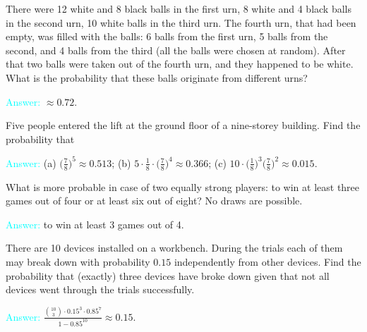 \documentclass[14pt]{exam}
\begin{document}
\begin{questions}
		
		\question
		There were 12 white and 8 black balls in the first urn, 8 white and 4 black balls in the second urn, 10 white balls in the third urn. The fourth urn, that had been empty, was filled with the balls: 6 balls from the first urn, 5 balls from the second, and 4 balls from the third (all the balls were chosen at random). After that two balls were taken out of the fourth urn, and they happened to be white. What is the probability that these balls originate from different urns?
		
		\textcolor{cyan}{Answer:} $\approx0.72$.
		
		\question
		Five people entered the lift at the ground floor of a nine-storey building. Find the probability that
		
		
		\textcolor{cyan}{Answer:} (a) $ \bigr(\frac{7}{8}\bigr)^5 \approx 0.513$; (b) $5 \cdot \frac{1}{8}\cdot \bigr(\frac{7}{8}\bigr)^4\approx 0.366$; (c) $10 \cdot \bigr(\frac{1}{8}\bigr)^3 \bigr(\frac{7}{8}\bigr)^2\approx 0.015$.
		
		\question
		What is more probable in case of two equally strong players: to win at least three games out of four or at least six out of eight? No draws are possible.
		
		\textcolor{cyan}{Answer:} to win at least 3 games out of 4.
		
		\question
		There are 10 devices installed on a workbench. During the trials each of them may break down with probability $0.15$ independently from other devices. Find the probability that (exactly) three devices have broke down given that not all devices went through the trials successfully.
		
		\textcolor{cyan}{Answer:} $\frac{\binom{10}{3}\cdot 0.15^{3}  \cdot 0.85^{7}}{1 - 0.85 ^{10}} \approx 0.15$.
		

\end{questions}
\end{document}
